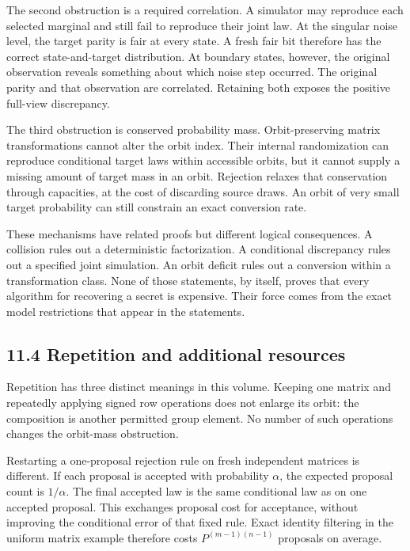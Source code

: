 \documentclass[
]{article}
\begin{document}
The second obstruction is a required correlation. A simulator may
reproduce each selected marginal and still fail to reproduce their joint
law. At the singular noise level, the target parity is fair at every
state. A fresh fair bit therefore has the correct state-and-target
distribution. At boundary states, however, the original observation
reveals something about which noise step occurred. The original parity
and that observation are correlated. Retaining both exposes the positive
full-view discrepancy.

The third obstruction is conserved probability mass. Orbit-preserving
matrix transformations cannot alter the orbit index. Their internal
randomization can reproduce conditional target laws within accessible
orbits, but it cannot supply a missing amount of target mass in an
orbit. Rejection relaxes that conservation through capacities, at the
cost of discarding source draws. An orbit of very small target
probability can still constrain an exact conversion rate.

These mechanisms have related proofs but different logical consequences.
A collision rules out a deterministic factorization. A conditional
discrepancy rules out a specified joint simulation. An orbit deficit
rules out a conversion within a transformation class. None of those
statements, by itself, proves that every algorithm for recovering a
secret is expensive. Their force comes from the exact model restrictions
that appear in the statements.

\subsection{11.4 Repetition and additional
resources}\label{repetition-and-additional-resources}

Repetition has three distinct meanings in this volume. Keeping one
matrix and repeatedly applying signed row operations does not enlarge
its orbit: the composition is another permitted group element. No number
of such operations changes the orbit-mass obstruction.

Restarting a one-proposal rejection rule on fresh independent matrices
is different. If each proposal is accepted with probability \(\alpha\),
the expected proposal count is \(1/\alpha\). The final accepted law is
the same conditional law as on one accepted proposal. This exchanges
proposal cost for acceptance, without improving the conditional error of
that fixed rule. Exact identity filtering in the uniform matrix example
therefore costs \(P^{(m-1)(n-1)}\) proposals on average.
\end{document}
